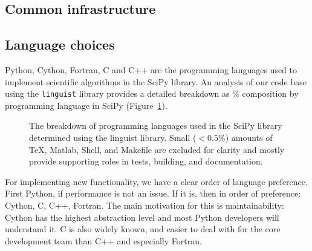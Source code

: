 \documentclass[fleqn,10pt]{wlscirep}
\begin{document}


\subsection*{Common infrastructure}

\subsection*{Language choices}

Python, Cython, Fortran, C and C++ are the programming languages used to
implement scientific algorithms in the SciPy library. An analysis of our code
base using the \texttt{linguist} library\cite{linguistref} provides a 
detailed breakdown as \% composition by programming language in 
SciPy (Figure~\ref{fig:linguist}).

\begin{figure}[H]
    \centering

    \caption{The breakdown of programming languages used in the
             SciPy library determined using the linguist library.
    	 Small ($<0.5 \%$) amounts of TeX, Matlab, Shell,
    	 and Makefile are excluded for clarity and mostly
    	 provide supporting roles in tests, building, and
    	 documentation.}
    \label{fig:linguist}
\end{figure}

For implementing new functionality, we have a clear order of language
preference.  First Python, if performance is not an issue. If it is, then in
order of preference: Cython, C, C++, Fortran. The main motivation for this is
maintainability: Cython has the highest abstraction level and most Python
developers will understand it. C is also widely known, and easier to deal with
for the core development team than C++ and especially Fortran.
\end{document}
